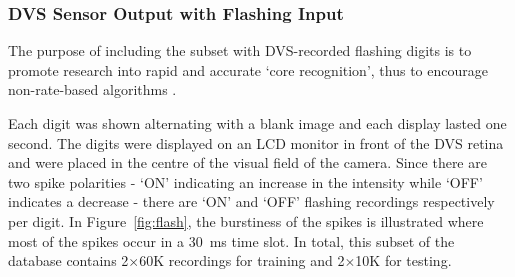 %
%
%
%


\subsubsection{DVS Sensor Output with Flashing Input}
\label{subsec_flash}
The purpose of including the subset with DVS-recorded flashing digits is to promote research into rapid and accurate `core recognition', thus to encourage \DIFdelbegin {}\DIFdelend \DIFaddbegin {}\DIFaddend non-rate-based algorithms \DIFdelbegin {}\DIFdelend \DIFaddbegin {}\DIFaddend .

\DIFaddbegin 

\DIFaddend Each digit was shown alternating with a blank image and each display lasted one second.
The digits were displayed on an LCD monitor in front of the DVS retina~\citep{serrano2013128} and were placed in the centre of the visual field of the camera.
Since there are two spike polarities - `ON' indicating an increase in the intensity while `OFF' indicates a decrease - there are `ON' and `OFF' flashing recordings respectively per digit.
In Figure~\ref{fig:flash}, the burstiness of the spikes is illustrated where most of the spikes occur in a 30~ms time slot. 
In total, this subset of the database contains 2$\times$60K recordings for training and 2$\times$10K for testing.

